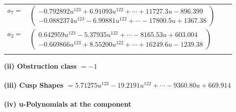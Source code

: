 \documentclass[1p]{elsarticle_modified}
\theoremstyle{definition}
\begin{document}
\begin{tabular}{m{7pt} m{180pt} m{7pt} m{180pt} }
\flushright $a_{7}=$&$\begin{pmatrix}-0.792892 u^{123}+6.91093 u^{122}+\cdots+11727.3 u-896.399\\-0.0882374 u^{123}-6.99881 u^{122}+\cdots-17800.5 u+1367.38\end{pmatrix}$ \\
\flushright $a_{2}=$&$\begin{pmatrix}0.642959 u^{123}-5.37935 u^{122}+\cdots-8165.53 u+603.004\\-0.669866 u^{123}+8.55200 u^{122}+\cdots+16249.6 u-1239.38\end{pmatrix}$\\&\end{tabular}
\flushleft \textbf{(ii) Obstruction class $= -1$}\\~\\
\flushleft \textbf{(iii) Cusp Shapes $= 5.71275 u^{123}-19.2191 u^{122}+\cdots-9360.80 u+669.914$}\\~\\
\newpage\renewcommand{\arraystretch}{1}
\flushleft \textbf{(iv) u-Polynomials at the component}\newline \\
\end{document}

